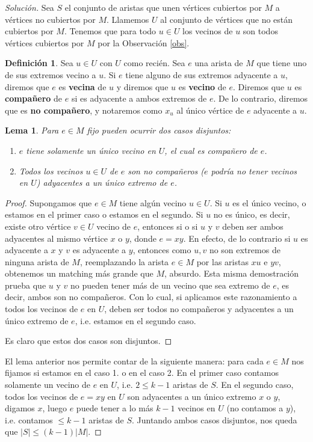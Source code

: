 \documentclass[12pt]{report}
\theoremstyle{plain}
\newtheorem{lemma}[theorem]{Lema}
\theoremstyle{definition}
\newtheorem{definition}[theorem]{Definición}
\newenvironment{solution}{\begin{proof}[Solución]}{\end{proof}}
\newcommand{\abs}[1]{\left \vert #1 \right \vert}
\begin{document}
\begin{solution}
Sea $S$ el conjunto de aristas que unen vértices cubiertos por $M$ a vértices no cubiertos por $M$. Llamemos $U$ al conjunto de vértices que no están cubiertos por $M$. Tenemos que para todo $u \in U$ los vecinos de $u$ son todos vértices cubiertos por $M$ por la Observación \ref{obs}.

\begin{definition}
Sea $u \in U$ con $U$ como recién. Sea $e$ una arista de $M$ que tiene uno de sus extremos vecino a $u$. Si $e$ tiene alguno de sus extremos adyacente a $u$, diremos que $e$ es \textbf{vecina} de $u$ y diremos que $u$ es \textbf{vecino} de $e$. Diremos que $u$ es \textbf{compañero} de $e$ si es adyacente a ambos extremos de $e$. De lo contrario, diremos que es \textbf{no compañero}, y notaremos como $x_u$ al único vértice de $e$ adyacente a $u$.
\end{definition}

\begin{lemma}
Para $e \in M$ fijo pueden ocurrir dos casos disjuntos:
\begin{enumerate}
\item $e$ tiene solamente un único vecino en $U$, el cual es compañero de $e$.
\item Todos los vecinos $u \in U$ de $e$ son \textit{no compañeros} ($e$ podría no tener vecinos en $U$) adyacentes a un único extremo de $e$.
\end{enumerate}
\end{lemma}
\begin{proof}
Supongamos que $e \in M$ tiene algún vecino $u \in U$. Si $u$ es el único vecino, o estamos en el primer caso o estamos en el segundo. Si $u$ no es único, es decir, existe otro vértice $v \in U$ vecino de $e$, entonces si o si $u$ y $v$ deben ser ambos adyacentes al mismo vértice $x$ o $y$, donde $e = xy$. En efecto, de lo contrario si $u$ es adyacente a $x$ y $v$ es adyacente a $y$, entonces como $u,v$ no son extremos de ninguna arista de $M$, reemplazando la arista $e \in M$ por las aristas $xu$ e $yv$, obtenemos un matching más grande que $M$, absurdo. Esta misma demostración prueba que $u$ y $v$ no pueden tener más de un vecino que sea extremo de $e$, es decir, ambos son no compañeros. Con lo cual, si aplicamos este razonamiento a todos los vecinos de $e$ en $U$, deben ser todos no compañeros y adyacentes a un único extremo de $e$, i.e. estamos en el segundo caso.

Es claro que estos dos casos son disjuntos.
\end{proof}

El lema anterior nos permite contar de la siguiente manera: para cada $e \in M$ nos fijamos si estamos en el caso 1. o en el caso 2. En el primer caso contamos solamente un vecino de $e$ en $U$, i.e. $2 \leq k-1$ aristas de $S$. En el segundo caso, todos los vecinos de $e =xy$ en $U$ son adyacentes a un único extremo $x$ o $y$, digamos $x$, luego $e$ puede tener a lo más $k-1$ vecinos en $U$ (no contamos a $y$), i.e. contamos $\leq k-1$ aristas de $S$. Juntando ambos casos disjuntos, nos queda que $\abs S \leq (k-1) \abs M$.
\end{solution}
\end{document}

